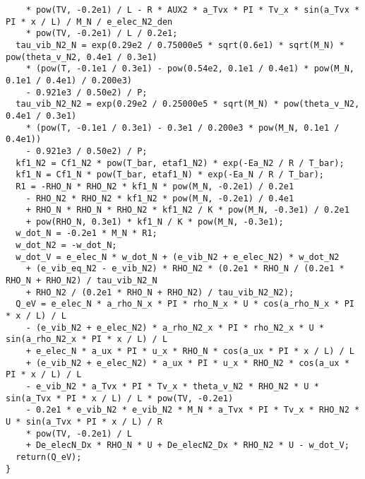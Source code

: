 \documentclass[10pt]{article}
\begin{document}
\begin{footnotesize}
\begin{verbatim}
    * pow(TV, -0.2e1) / L - R * AUX2 * a_Tvx * PI * Tv_x * sin(a_Tvx * PI * x / L) / M_N / e_elec_N2_den 
    * pow(TV, -0.2e1) / L / 0.2e1;
  tau_vib_N2_N = exp(0.29e2 / 0.75000e5 * sqrt(0.6e1) * sqrt(M_N) * pow(theta_v_N2, 0.4e1 / 0.3e1) 
    * (pow(T, -0.1e1 / 0.3e1) - pow(0.54e2, 0.1e1 / 0.4e1) * pow(M_N, 0.1e1 / 0.4e1) / 0.200e3) 
    - 0.921e3 / 0.50e2) / P;
  tau_vib_N2_N2 = exp(0.29e2 / 0.25000e5 * sqrt(M_N) * pow(theta_v_N2, 0.4e1 / 0.3e1) 
    * (pow(T, -0.1e1 / 0.3e1) - 0.3e1 / 0.200e3 * pow(M_N, 0.1e1 / 0.4e1)) 
    - 0.921e3 / 0.50e2) / P;
  kf1_N2 = Cf1_N2 * pow(T_bar, etaf1_N2) * exp(-Ea_N2 / R / T_bar);
  kf1_N = Cf1_N * pow(T_bar, etaf1_N) * exp(-Ea_N / R / T_bar);
  R1 = -RHO_N * RHO_N2 * kf1_N * pow(M_N, -0.2e1) / 0.2e1 
    - RHO_N2 * RHO_N2 * kf1_N2 * pow(M_N, -0.2e1) / 0.4e1 
    + RHO_N * RHO_N * RHO_N2 * kf1_N2 / K * pow(M_N, -0.3e1) / 0.2e1 
    + pow(RHO_N, 0.3e1) * kf1_N / K * pow(M_N, -0.3e1);
  w_dot_N = -0.2e1 * M_N * R1;
  w_dot_N2 = -w_dot_N;
  w_dot_V = e_elec_N * w_dot_N + (e_vib_N2 + e_elec_N2) * w_dot_N2 
    + (e_vib_eq_N2 - e_vib_N2) * RHO_N2 * (0.2e1 * RHO_N / (0.2e1 * RHO_N + RHO_N2) / tau_vib_N2_N 
    + RHO_N2 / (0.2e1 * RHO_N + RHO_N2) / tau_vib_N2_N2);
  Q_eV = e_elec_N * a_rho_N_x * PI * rho_N_x * U * cos(a_rho_N_x * PI * x / L) / L 
    - (e_vib_N2 + e_elec_N2) * a_rho_N2_x * PI * rho_N2_x * U * sin(a_rho_N2_x * PI * x / L) / L 
    + e_elec_N * a_ux * PI * u_x * RHO_N * cos(a_ux * PI * x / L) / L 
    + (e_vib_N2 + e_elec_N2) * a_ux * PI * u_x * RHO_N2 * cos(a_ux * PI * x / L) / L 
    - e_vib_N2 * a_Tvx * PI * Tv_x * theta_v_N2 * RHO_N2 * U * sin(a_Tvx * PI * x / L) / L * pow(TV, -0.2e1) 
    - 0.2e1 * e_vib_N2 * e_vib_N2 * M_N * a_Tvx * PI * Tv_x * RHO_N2 * U * sin(a_Tvx * PI * x / L) / R 
    * pow(TV, -0.2e1) / L 
    + De_elecN_Dx * RHO_N * U + De_elecN2_Dx * RHO_N2 * U - w_dot_V;
  return(Q_eV);
}
\end{verbatim}
 \end{footnotesize}
\end{document}
